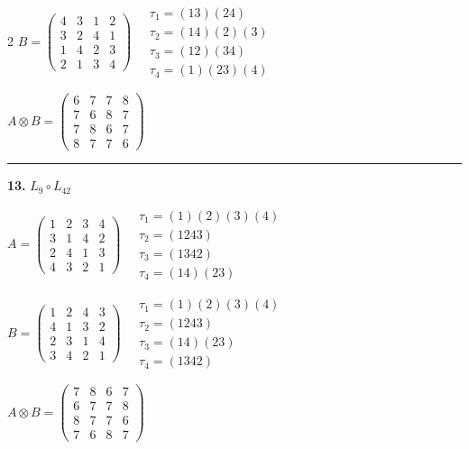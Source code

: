 \begin{multicols}{2}
$B = \begin{pmatrix} 4 & 3 & 1 & 2 \\ 3 & 2 & 4 & 1 \\ 1 & 4 & 2 & 3 \\ 2 & 1 & 3 & 4 \end{pmatrix} \quad \begin{matrix} \tau_{1}=(1 3)(2 4) \\ \tau_{2}=(1 4)(2)(3) \\ \tau_{3}=(1 2)(3 4) \\ \tau_{4}=(1)(2 3)(4) \end{matrix}$

$A \otimes B = \begin{pmatrix} 6 & 7 & 7 & 8 \\ 7 & 6 & 8 & 7 \\ 7 & 8 & 6 & 7 \\ 8 & 7 & 7 & 6 \end{pmatrix}$

\vspace{0.3em}
\hrule
\vspace{0.3em}

\noindent\textbf{13.} $L_{9} \circ L_{42}$

$A = \begin{pmatrix} 1 & 2 & 3 & 4 \\ 3 & 1 & 4 & 2 \\ 2 & 4 & 1 & 3 \\ 4 & 3 & 2 & 1 \end{pmatrix} \quad \begin{matrix} \tau_{1}=(1)(2)(3)(4) \\ \tau_{2}=(1 2 4 3) \\ \tau_{3}=(1 3 4 2) \\ \tau_{4}=(1 4)(2 3) \end{matrix}$

$B = \begin{pmatrix} 1 & 2 & 4 & 3 \\ 4 & 1 & 3 & 2 \\ 2 & 3 & 1 & 4 \\ 3 & 4 & 2 & 1 \end{pmatrix} \quad \begin{matrix} \tau_{1}=(1)(2)(3)(4) \\ \tau_{2}=(1 2 4 3) \\ \tau_{3}=(1 4)(2 3) \\ \tau_{4}=(1 3 4 2) \end{matrix}$

$A \otimes B = \begin{pmatrix} 7 & 8 & 6 & 7 \\ 6 & 7 & 7 & 8 \\ 8 & 7 & 7 & 6 \\ 7 & 6 & 8 & 7 \end{pmatrix}$


\end{multicols}

